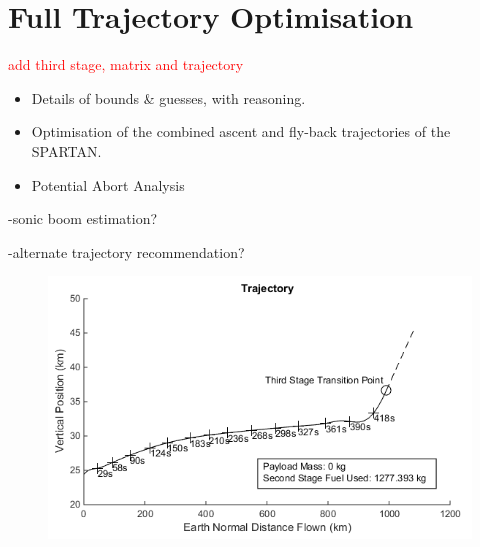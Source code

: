 
\cleardoublepage
\chapter{Full Trajectory Optimisation}\label{chapter:numerical}

\textcolor{red}{add third stage, matrix and trajectory}



\begin{itemize}
	\item Details of bounds \& guesses, with reasoning. 
	\item Optimisation of the combined ascent and fly-back trajectories of the SPARTAN.
	\item Potential Abort Analysis
\end{itemize}


-sonic boom estimation?

-alternate trajectory recommendation?


\begin{figure}
	\centering
	\includegraphics[width=0.9\linewidth]{figures/7_Full/Ascent}
	\caption{}
	\label{fig:ascent}
\end{figure}


